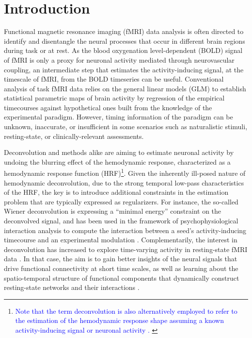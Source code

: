 
\section{Introduction}

Functional magnetic resonance imaging (fMRI) data analysis is often directed to
identify and disentangle the neural processes that occur in different brain
regions during task or at rest. As the blood oxygenation level-dependent (BOLD)
signal of fMRI is only a proxy for neuronal activity mediated through
neurovascular coupling, an intermediate step that estimates the
activity-inducing signal, at the timescale of fMRI, from the BOLD timeseries can
be useful. Conventional analysis of task fMRI data relies on the general linear
models (GLM) to establish statistical parametric maps of brain activity by
regression of the empirical timecourses against hypothetical ones built from the
knowledge of the experimental paradigm. However, timing information of the
paradigm can be unknown, inaccurate, or insufficient in some scenarios such as
naturalistic stimuli, resting-state, or clinically-relevant assessments.

Deconvolution and methods alike are aiming to estimate neuronal activity by
undoing the blurring effect of the hemodynamic response, characterized as a
hemodynamic response function (HRF)\footnote{\textcolor{blue}{Note that the term
deconvolution is also alternatively employed to refer to the estimation of the
hemodynamic response shape assuming a known activity-inducing signal or neuronal
activity
\citep{Goutte2000Modelinghaemodynamicresponse,Marrelec2002Bayesianestimationhemodynamic,
Ciuciu2003Unsupervisedrobustnonparametric,Casanova2008impacttemporalregularization}.
}}. Given the inherently ill-posed nature of
hemodynamic deconvolution, due to the strong temporal low-pass characteristics
of the HRF, the key is to introduce additional constraints in the estimation
problem that are typically expressed as regularizers. For instance, the
so-called Wiener deconvolution is expressing a ``minimal energy'' constraint on
the deconvolved signal, and has been used in the framework of
psychophysiological interaction analysis to compute the interaction between a
seed's activity-inducing timecourse and an experimental modulation
\citep{Glover1999DeconvolutionImpulseResponse,Gitelman2003Modelingregionalpsychophysiologic,
Gerchen2014Analyzingtaskdependent,Di2018TaskConnectomicsExamining,
Freitas2020Timeresolvedeffective}.
Complementarily, the interest in deconvolution has increased to explore
time-varying activity in resting-state fMRI data
\citep{Preti2017dynamicfunctionalconnectome,Keilholz2017TimeResolvedResting,
Lurie2020Questionscontroversiesstudy,Bolton2020TappingMultiFaceted}.
In that case, the aim is to gain better insights of the neural signals that
drive functional connectivity at short time scales, as well as learning about
the spatio-temporal structure of functional components that dynamically
construct resting-state networks and their interactions
\citep{Karahanoglu2017Dynamicslargescale}.

